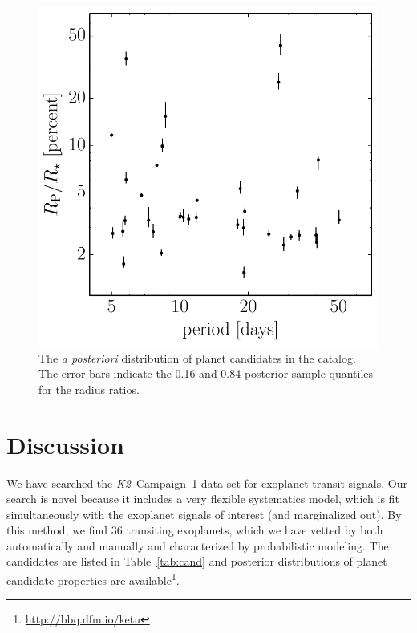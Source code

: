 \documentclass[12pt,preprint]{aastex}
\newcommand{\project}[1]{\textsl{#1}} %
\newcommand{\KT}{\project{K2}}
\newcommand{\figlabel}[1]{\label{fig:#1}}
\newcommand{\Tab}[1]{Table~\ref{tab:#1}}
\newcommand{\tab}[1]{\Tab{#1}}
\newcommand{\datareleaseurl}{{\url{http://bbq.dfm.io/ketu}}}
\begin{document}
\begin{figure}[p]
\begin{center}
\includegraphics{figures/candidates.pdf}
\end{center}
\caption{%
The \emph{a posteriori} distribution of planet candidates in the catalog.
The error bars indicate the 0.16 and 0.84 posterior sample quantiles for the
radius ratios.
\figlabel{candidates}}
\end{figure}


\section{Discussion}

We have searched the \KT\ Campaign~1 data set for exoplanet transit signals.
Our search is novel because it includes a very flexible systematics model,
which is fit simultaneously with the exoplanet signals of interest (and
marginalized out).
By this method, we find 36 transiting exoplanets, which we have vetted by both
automatically and manually and characterized by probabilistic modeling.
The candidates are listed in \tab{cand} and posterior distributions of planet
candidate properties are available\footnote{\datareleaseurl}.
\end{document}
